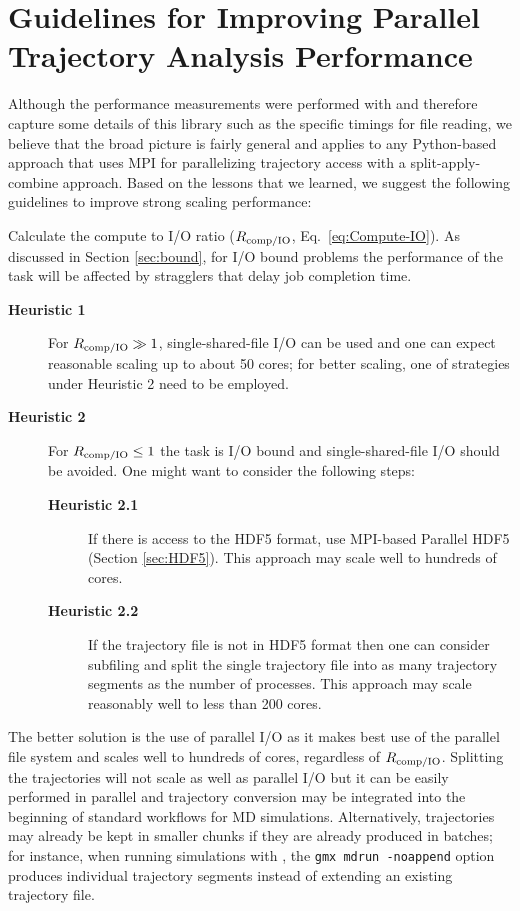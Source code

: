 
\section{Guidelines for Improving Parallel Trajectory Analysis Performance}
\label{sec:guidelines}

Although the performance measurements were performed with  and therefore capture some details of this library such as the specific timings for file reading, we believe that the broad picture is fairly general and applies to any Python-based approach that uses MPI for parallelizing trajectory access with a split-apply-combine approach.
Based on the lessons that we learned, we suggest the following guidelines to improve strong scaling performance:

Calculate the compute to I/O ratio ($R_{\text{comp/IO}}$, Eq.~\ref{eq:Compute-IO}). As discussed in Section \ref{sec:bound}, for I/O bound problems the performance of the task will be affected by stragglers that delay job completion time.
\begin{description}
\item[\textbf{Heuristic 1}] For $R_{\text{comp/IO}} \gg 1$, single-shared-file I/O can be used and one can expect reasonable scaling up to about 50 cores; for better scaling, one of strategies under Heuristic 2 need to be employed.
\item[\textbf{Heuristic 2}] For $R_{\text{comp/IO}} \le 1$ the task is I/O bound and single-shared-file I/O should be avoided.
  One might want to consider the following steps:  
  \begin{description}
  \item[\textbf{Heuristic 2.1}] If there is access to the HDF5 format, use MPI-based Parallel HDF5 (Section \ref{sec:HDF5}). This approach may scale well to hundreds of cores.
  \item[\textbf{Heuristic 2.2}] If the trajectory file is not in HDF5 format then one can consider subfiling and split the single trajectory file into as many trajectory segments as the number of processes. This approach may scale reasonably well to less than 200 cores.
  \end{description}
\end{description}

The better solution is the use of parallel I/O as it makes best use of the parallel file system and scales well to hundreds of cores, regardless of $R_{\text{comp/IO}}$. 
Splitting the trajectories will not scale as well as parallel I/O but it can be easily performed in parallel and trajectory conversion may be integrated into the beginning of standard workflows for MD simulations.  Alternatively, trajectories may already be kept in smaller chunks if they are already produced in batches; for instance, when running simulations with  \cite{Abraham:2015aa}, the \texttt{gmx mdrun -noappend} option produces individual trajectory segments instead of extending an existing trajectory file.
